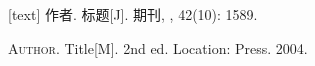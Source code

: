 \documentclass{ctexbeamer}
\begin{document}
\begin{frame}
  \begin{thebibliography}{00}
    [text]
     作者.
    \newblock 标题[J].
    \newblock 期刊,
    , 42(10): 1589.
  \end{thebibliography}
  \begin{bibliolist}{00}
    \bookitem \textsc{Author}.
    \newblock Title[M].
    \newblock 2nd ed. Location: Press. 2004.
  \end{bibliolist}
\end{frame}
\end{document}
